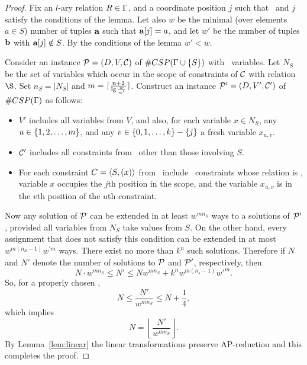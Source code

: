 \begin{proof}
Fix an \(l\)-ary relation \(R \in \Gamma\)\@, and 
a coordinate position \(j\) such that \mR\ and \(j\) satisfy the conditions of the lemma.
Let also \(w\) be the minimal (over elements \(a\in S\)) number of tuples \(\textbf{a}\)
such that \(\textbf{a}[j]=a\), and let \(w'\) be the number of tuples \(\textbf{b}\) with
\(\textbf{a}[j] \notin S\). By the conditions of the lemma \(w'<w\)\@.

Consider an instance \(\mathcal{P}=(D,V,\mathcal{C})\) of \(\#CSP(\Gamma \cup \{{S}\})\)
with \mn\ variables. Let \(N_S\) be the set of
variables which occur in the scope of constraints of \(\mathcal{C}\) with relation \(\S\)\@. 
Set \(n_S = |N_S|\) and \(m = \lceil\frac{n+2}{\lg{\frac{w}{w'}}}\rceil\)\@.
Construct an instance \(\mathcal{P}'=(D,V',\mathcal{C}')\) of \(\#CSP(\Gamma)\) as follows:
\begin{itemize}
\item
\(V'\) includes all variables from \(V\),
and also, for each variable \(x \in N_S\), any \(u \in \{{{1,2,\dotsc,m}}\}\), and any
\(v\in\{{0,1,\dotsc,k}\}-\{j\}\) a fresh variable \(x_{u,v}\)\@. 
\item 
\(\mathcal{C}'\) includes all constraints from \mconset\ other than those involving \(S\)\@. 
\item
For each constraint \(C=\langle S, (x) \rangle\) from \mconset\ include \mm\ constraints whose
relation is \mR, variable \(x\) occupies the \(j\)th position in the scope,
and the variable \(x_{u,v}\) is in the \(v\)th position of the \(u\)th constraint.
\end{itemize}

Now any solution of \(\mathcal{P}\) can be extended in at least \(w^{mn_S}\) 
ways to a solutions of \(\mathcal{P}'\)\@, provided all variables from \(N_S\)
take values from \(S\)\@. On the other hand, every assignment that does not satisfy this
condition can be extended in at most \(w^{m(n_S-1)}w^{\prime m}\) ways.
There exist no more than \(k^n\) such solutions. Therefore if \(N\) and \(N'\)
denote the number of solutions to \(\mathcal{P}\) and \(\mathcal{P}'\), respectively, then
\[N\cdot w^{mn_S} \le N' \le Nw^{mn_S} + k^nw^{m(n_s-1)}w'^m.\]
So, for a properly chosen \mm, 
\[N \le \frac{N'}{w^{mn_S}} \le N + \frac{1}{4},\]
which implies
\[N = \left\lfloor \frac{N'}{w^{mn_S}} \right\rfloor.\]
By Lemma~\ref{lem:linear} the linear transformations preserve AP-reduction
and this completes the proof.
\end{proof}


